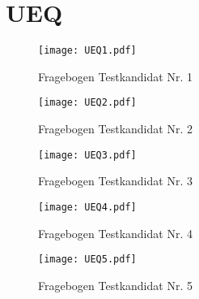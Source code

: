 \section{UEQ}
\label{sec:ueqs}

\begin{figure}[h!]
\texttt{[image: UEQ1.pdf]}
\caption{\label{fig:UEQ1}Fragebogen Testkandidat Nr. 1}
\end{figure}
\begin{figure}[h!]
\texttt{[image: UEQ2.pdf]}
\caption{\label{fig:UEQ2}Fragebogen Testkandidat Nr. 2}
\end{figure}
\begin{figure}[h!]
\texttt{[image: UEQ3.pdf]}
\caption{\label{fig:UEQ3}Fragebogen Testkandidat Nr. 3}
\end{figure}
\begin{figure}[h!]
\texttt{[image: UEQ4.pdf]}
\caption{\label{fig:UEQ4}Fragebogen Testkandidat Nr. 4}
\end{figure}
\begin{figure}[h!]
\texttt{[image: UEQ5.pdf]}
\caption{\label{fig:UEQ5}Fragebogen Testkandidat Nr. 5}
\end{figure}

